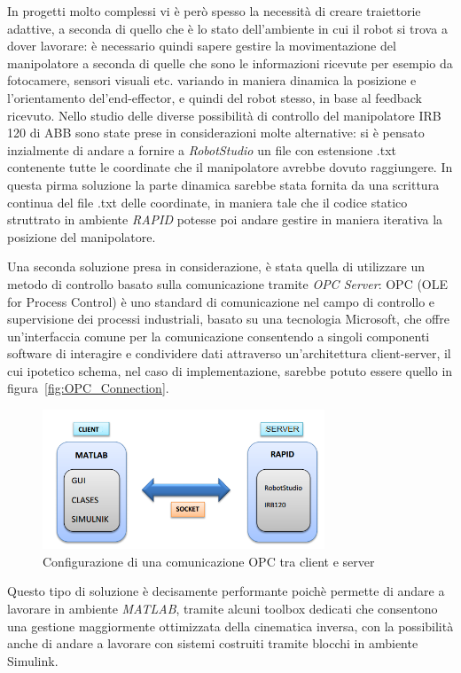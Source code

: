 In progetti molto complessi vi è però spesso la necessità di creare traiettorie adattive, a seconda di quello che è lo stato dell'ambiente in cui il robot si trova a dover lavorare: è necessario quindi sapere gestire la movimentazione del manipolatore a seconda di quelle che sono le informazioni ricevute per esempio da fotocamere, sensori visuali etc. variando in maniera dinamica la posizione e l'orientamento del'end-effector, e quindi del robot stesso, in base al feedback ricevuto.
Nello studio delle diverse possibilità di controllo del manipolatore IRB 120 di ABB sono state prese in considerazioni molte alternative: si è pensato inzialmente di andare a fornire a \emph{RobotStudio} un file con estensione .txt contenente tutte le coordinate che il manipolatore avrebbe dovuto raggiungere. In questa pirma soluzione la parte dinamica sarebbe stata fornita da una scrittura continua del file .txt delle coordinate, in maniera tale che il codice statico struttrato in ambiente \emph{RAPID} potesse poi andare gestire in maniera iterativa la posizione del manipolatore.

Una seconda soluzione presa in considerazione, è stata quella di utilizzare un metodo di controllo basato sulla comunicazione tramite \emph{OPC Server}: OPC (OLE for Process Control) è uno standard di comunicazione nel campo di controllo e supervisione dei processi industriali, basato su una tecnologia Microsoft, che offre un'interfaccia comune per la comunicazione consentendo a singoli componenti software di interagire e condividere dati attraverso un'architettura client-server, il cui ipotetico schema, nel caso di implementazione, sarebbe potuto essere quello in figura~\vref{fig:OPC_Connection}.
\begin{figure}
	\centering
	\includegraphics[width=0.75\textwidth]{Immagini/OPC_Configuration}
	\caption{Configurazione di una comunicazione OPC tra client e server}
	\label{fig:OPC_Connection}
\end{figure}

Questo tipo di soluzione è decisamente performante poichè permette di andare a lavorare in ambiente \emph{MATLAB}, tramite alcuni toolbox dedicati che consentono una gestione maggiormente ottimizzata della cinematica inversa, con la possibilità anche di andare a lavorare con sistemi costruiti tramite blocchi in ambiente Simulink.

